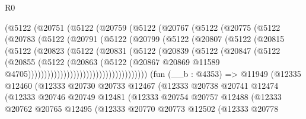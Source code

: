 \begin{lexlean}{R0}
\begin{coremodule}
              (@5122
                (@20751
                  (@5122
                    (@20759
                      (@5122
                        (@20767
                          (@5122
                            (@20775
                              (@5122
                                (@20783
                                  (@5122
                                    (@20791
                                      (@5122
                                        (@20799
                                          (@5122
                                            (@20807
                                              (@5122
                                                (@20815
                                                  (@5122
                                                    (@20823
                                                      (@5122
                                                        (@20831
                                                          (@5122
                                                            (@20839
                                                              (@5122
                                                                (@20847
                                                                  (@5122
                                                                    (@20855
                                                                      (@5122
                                                                        (@20863
                                                                          (@5122
                                                                            (@20867
                                                                              @20869
                                                                              @11589
                                                                              @4705)))))))))))))))))))))))))))))))))))))
    (fun (__b : @4353) =>
    @11949
      (@12335
        @12460
        (@12333
          @20730
          @20733
          @12467
          (@12333
            @20738
            @20741
            @12474
            (@12333
              @20746
              @20749
              @12481
              (@12333
                @20754
                @20757
                @12488
                (@12333
                  @20762
                  @20765
                  @12495
                  (@12333
                    @20770
                    @20773
                    @12502
                    (@12333
                      @20778

\end{coremodule}
\end{lexlean}
